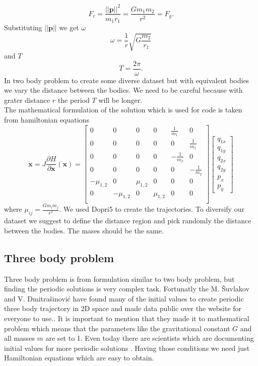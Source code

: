 \begin{equation}
	F_c = \frac{||\mathbf{p}||^2}{m_1r_1} = \frac{Gm_1m_2}{r^2} = F_g.
\end{equation}
Substituting $||\mathbf{p}||$ we get $\omega$
\begin{equation}
	\omega = \frac{1}{r}\sqrt{G\frac{m_2}{r_1}}
\end{equation} and $T$
 \begin{equation}
 	T = \frac{2\pi}{\omega}.
 \end{equation}
In two body problem to create some diverse dataset but with equivalent bodies we vary the distance between the bodies. We need to be careful because with grater distance $r$ the period $T$ will be longer.\\
The mathematical formulation of the solution which is used for code is taken from hamiltonian equations
\begin{equation}
	\dot{\mathbf{x}} = J\frac{\partial H}{\partial \mathbf{x}}(\mathbf{x})=
\begin{bmatrix}
	0 & 0 & 0 & 0 & \frac{1}{m_1} & 0\\
	0 & 0 & 0 & 0 & 0 & \frac{1}{m_1}\\
	0 & 0 & 0 & 0 & -\frac{1}{m_2} & 0\\
	0 & 0 & 0 & 0 & 0 & -\frac{1}{m_2}\\
	-\mu_{1,2} & 0 & \mu_{1,2} & 0 & 0 & 0 \\
	0 & -\mu_{1,2} & 0 & \mu_{1,2} & 0 & 0 \\
\end{bmatrix}
\begin{bmatrix}
	q_{1x}\\
	q_{1y}\\
	q_{2x}\\
	q_{2y}\\
	p_x\\
	p_y
\end{bmatrix} 
\end{equation} where $\mu_{ij}=\frac{Gm_im_j}{r^3}.$
We used Dopri5 to create the trajectories. To diversify our dataset we suggest to define the distance region and pick randomly the distance between the bodies. The mases should be the same.

\subsection{Three body problem}
Three body problem is from formulation similar to two body problem, but finding the periodic solutions is very complex task. Fortunatly the M. Šuvlakov and V. Dmitrašinović have found many of the initial values to create periodic three body trajectory in 2D space and made data public over the website for everyone to use.\cite{papthreebody}\cite{web}. It is important to mention that they made it to mathematical problem which means that the parameters like the gravitational constant $G$ and all masses $m$ are set to 1.
Even today there are scientists which are documenting initial values for more periodic solutions \cite{hudomal2015new}.
Having those conditions we need just Hamiltonian equations which are easy to obtain. 

